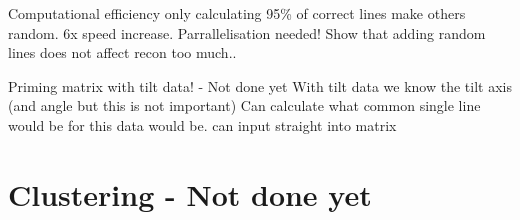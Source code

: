 \documentclass[t, 11pt]{beamer}
\begin{document}
\begin{frame}[fragile]{Computational efficiency}
  only calculating 95\% of correct lines make others random. 6x speed increase. Parrallelisation needed!
  Show that adding random lines does not affect recon too much..
\end{frame}

\begin{frame}[fragile]{Priming matrix with tilt data! - Not done yet}
  With tilt data we know the tilt axis (and angle but this is not important)
  Can calculate what common single line would be for this data would be. can input straight into matrix
\end{frame}


\section{Clustering - Not done yet}
\end{document}
